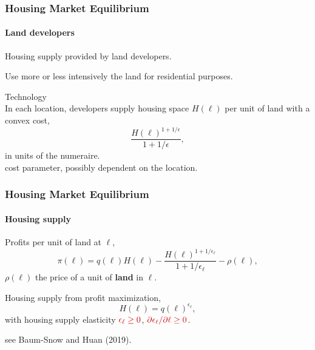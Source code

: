 \documentclass[aspectratio=169]{beamer}
\begin{document}
%
%

\begin{frame}[label=landdevelopers]
\frametitle{Housing Market Equilibrium}
\framesubtitle{Land developers}
\bi
\item Housing supply provided by land developers.
\item Use more or less intensively the land for residential purposes.
\item Technology\\
\medskip
In each location, developers supply housing space $H(\ell)$ per unit of land with a convex cost,
\begin{equation*}
\frac{H(\ell)^{1+1/\epsilon}}{1+1/\epsilon},
\end{equation*}
in units of the numeraire.\\
 \re{$\epsilon=$} cost parameter, possibly dependent on the location.
\ei
\end{frame}

\begin{frame}
\frametitle{Housing Market Equilibrium}
\framesubtitle{Housing supply}
\bi
\item Profits per unit of land at $\ell$,
\begin{equation*}
\pi(\ell)=q(\ell)H(\ell)-\frac{H(\ell)^{1+1/\epsilon_{\ell}}}{ 1+1/\epsilon_{\ell} }- \rho(\ell),
\end{equation*}
$\rho(\ell)$ the price of a unit of \textbf{land} in $\ell$.
\item Housing supply from profit maximization,
\begin{equation*}
H(\ell)=q(\ell) ^{\epsilon_{\ell}},
\end{equation*}
with housing supply elasticity  $\re{\epsilon_{\ell}\geq 0}$, $\re{\partial\epsilon_{\ell}/\partial \ell \geq 0}$.

see Baum-Snow and Huan (2019).  %
\ei
\end{frame}
\end{document}
